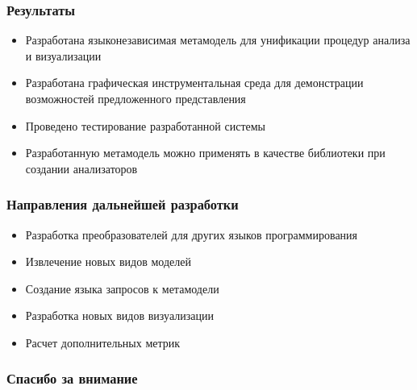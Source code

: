 \documentclass[handout]{beamer}
\begin{document}
\begin{frame}
\frametitle{Результаты}

\begin{itemize}
    \item Разработана языконезависимая метамодель для унификации процедур анализа
    и визуализации
    \item Разработана графическая инструментальная среда для демонстрации
    возможностей предложенного представления
    \item Проведено тестирование разработанной системы
    \item Разработанную метамодель можно применять в качестве библиотеки при
    создании анализаторов
\end{itemize}

\end{frame}
\begin{frame}
\frametitle{Направления дальнейшей разработки}

\begin{itemize}
    \item Разработка преобразователей для других языков программирования
    \item Извлечение новых видов моделей
    \item Создание языка запросов к метамодели
    \item Разработка новых видов визуализации
    \item Расчет дополнительных метрик
\end{itemize}

\end{frame}
\begin{frame}
\frametitle{Спасибо за внимание}
\end{frame}
\end{document}
